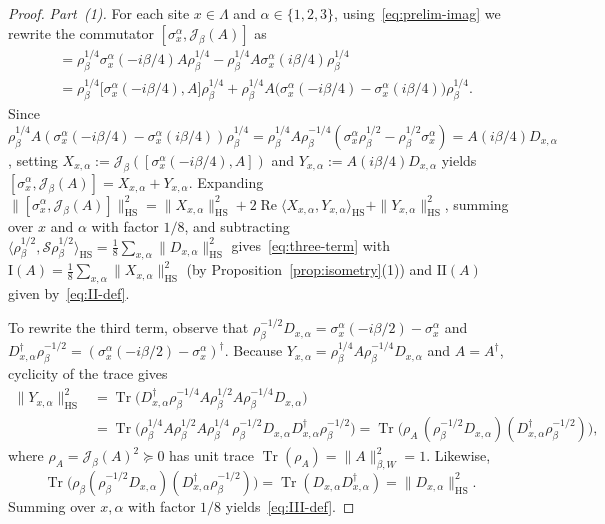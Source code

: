 \documentclass[11pt,a4paper]{article}
\numberwithin{equation}{section}
\theoremstyle{plain}
\theoremstyle{definition}
\newcommand{\HS}{\mathrm{HS}}
\newcommand{\Tr}{\operatorname{Tr}}
\begin{document}
\begin{proof}
\emph{Part~(1).} For each site $x\in\Lambda$ and $\alpha\in\{1,2,3\}$, using~\eqref{eq:prelim-imag} we rewrite the commutator $[\sigma_x^\alpha,\mathcal{J}_\beta(A)]$ as
\begin{align*}
  [\sigma_x^\alpha, \rho_\beta^{1/4} A \rho_\beta^{1/4}]
  &= \rho_\beta^{1/4}\sigma_x^\alpha(-i\beta/4)A\rho_\beta^{1/4} - \rho_\beta^{1/4} A \sigma_x^\alpha(i\beta/4)\rho_\beta^{1/4} \\
  &= \rho_\beta^{1/4}\bigl[\sigma_x^\alpha(-i\beta/4),A\bigr]\rho_\beta^{1/4}
     + \rho_\beta^{1/4} A \bigl(\sigma_x^\alpha(-i\beta/4) - \sigma_x^\alpha(i\beta/4)\bigr)\rho_\beta^{1/4}.
\end{align*}
Since $\rho_\beta^{1/4} A (\sigma_x^\alpha(-i\beta/4)-\sigma_x^\alpha(i\beta/4))\rho_\beta^{1/4} = \rho_\beta^{1/4}A\rho_\beta^{-1/4}(\sigma_x^\alpha\rho_\beta^{1/2} - \rho_\beta^{1/2}\sigma_x^\alpha) = A(i\beta/4)D_{x,\alpha}$, setting $X_{x,\alpha} := \mathcal{J}_\beta([\sigma_x^\alpha(-i\beta/4),A])$ and $Y_{x,\alpha} := A(i\beta/4)D_{x,\alpha}$ yields $[\sigma_x^\alpha,\mathcal{J}_\beta(A)] = X_{x,\alpha} + Y_{x,\alpha}$. Expanding $\|[ \sigma_x^\alpha,\mathcal{J}_\beta(A)]\|_\HS^2 = \|X_{x,\alpha}\|_\HS^2 + 2\operatorname{Re}\langle X_{x,\alpha}, Y_{x,\alpha}\rangle_\HS + \|Y_{x,\alpha}\|_\HS^2$, summing over $x$ and $\alpha$ with factor $1/8$, and subtracting $\langle\rho_\beta^{1/2},\mathcal{S}\rho_\beta^{1/2}\rangle_\HS = \frac{1}{8}\sum_{x,\alpha}\|D_{x,\alpha}\|_\HS^2$ gives~\eqref{eq:three-term} with $\mathrm{I}(A) = \frac{1}{8}\sum_{x,\alpha}\|X_{x,\alpha}\|_\HS^2$ (by Proposition~\ref{prop:isometry}(1)) and $\mathrm{II}(A)$ given by~\eqref{eq:II-def}.

To rewrite the third term, observe that $\rho_\beta^{-1/2}D_{x,\alpha} = \sigma_x^\alpha(-i\beta/2) - \sigma_x^\alpha$ and $D_{x,\alpha}^\dagger\rho_\beta^{-1/2} = (\sigma_x^\alpha(-i\beta/2)-\sigma_x^\alpha)^\dagger$. Because $Y_{x,\alpha} = \rho_\beta^{1/4}A\rho_\beta^{-1/4}D_{x,\alpha}$ and $A = A^\dagger$, cyclicity of the trace gives
\begin{align*}
  \|Y_{x,\alpha}\|_\HS^2
  &= \Tr\!\bigl(D_{x,\alpha}^\dagger \rho_\beta^{-1/4} A \rho_\beta^{1/2} A \rho_\beta^{-1/4} D_{x,\alpha}\bigr) \\
  &= \Tr\!\bigl(\rho_\beta^{1/4} A \rho_\beta^{1/2} A \rho_\beta^{1/4}\,\rho_\beta^{-1/2} D_{x,\alpha} D_{x,\alpha}^\dagger \rho_\beta^{-1/2}\bigr)
   = \Tr\!\bigl(\rho_A\,(\rho_\beta^{-1/2} D_{x,\alpha})(D_{x,\alpha}^\dagger \rho_\beta^{-1/2})\bigr),
\end{align*}
where $\rho_A = \mathcal{J}_\beta(A)^2 \succeq 0$ has unit trace $\Tr(\rho_A) = \|A\|_{\beta,W}^2 = 1$. Likewise,
\[
  \Tr\bigl(\rho_\beta(\rho_\beta^{-1/2}D_{x,\alpha})(D_{x,\alpha}^\dagger\rho_\beta^{-1/2})\bigr)
  = \Tr(D_{x,\alpha}D_{x,\alpha}^\dagger) = \|D_{x,\alpha}\|_\HS^2.
\]
Summing over $x,\alpha$ with factor $1/8$ yields~\eqref{eq:III-def}.


\end{proof}
\end{document}
